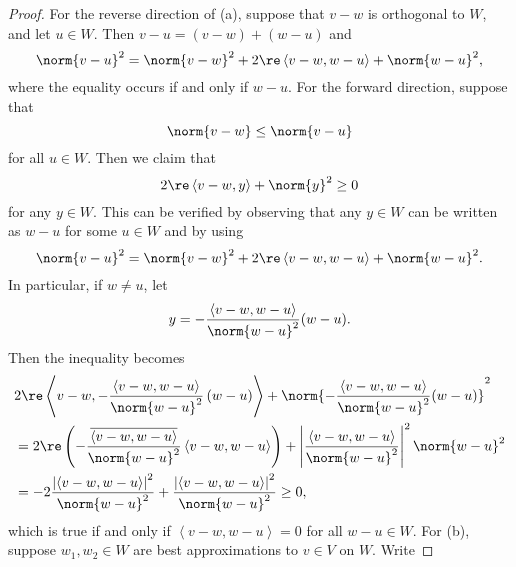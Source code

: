 \documentclass[linearalgebraII]{subfiles}
\begin{document}
    \begin{proof}
        For the reverse direction of (a), suppose that $v-w$ is orthogonal to $W$, and let $u\in W$. Then $v-u = \left( v-w \right) + \left( w-u \right)$ and
        \begin{equation*}
            \norm{v-u}^2 = \norm{v-w}^2 + 2\re\left\langle v-w, w-u\right\rangle + \norm{w-u}^2,
        \end{equation*}
        where the equality occurs if and only if $w-u$. For the forward direction, suppose that
        \begin{equation*}
            \norm{v-w}\leq \norm{v-u}
        \end{equation*}
        for all $u\in W$. Then we claim that
        \begin{equation*}
            2\re\left\langle v-w, y\right\rangle + \norm{y}^2 \geq 0
        \end{equation*}
        for any $y\in W$. This can be verified by observing that any $y\in W$ can be written as $w-u$ for some $u\in W$ and by using 
        \begin{equation*}
            \norm{v-u}^2 = \norm{v-w}^2 + 2\re\left\langle v-w, w-u\right\rangle + \norm{w-u}^2.
        \end{equation*}
        In particular, if $w\neq u$, let
        \begin{equation*}
            y = - \frac{\left\langle v-w, w-u\right\rangle }{\norm{w-u}^2} (w-u).
        \end{equation*}
        Then the inequality becomes
        \begin{align*}
            & 2\re\left\langle v-w, -\frac{\left\langle v-w, w-u\right\rangle }{\norm{w-u}^2}\left( w-u \right) \right\rangle +  \norm{-\frac{\left\langle v-w, w-u\right\rangle }{\norm{w-u}^2}(w-u)}^2 \\
            & = 2\re\left( -\frac{\overline{\left\langle v-w, w-u\right\rangle }}{\norm{w-u}^2}\left\langle v-w, w-u\right\rangle  \right) + \left| \frac{\left\langle v-w, w-u\right\rangle }{\norm{w-u}^2} \right| ^2 \norm{w-u}^2 \\
            & = -2 \frac{\left| \left\langle v-w, w-u\right\rangle  \right| ^2}{\norm{w-u}^2} + \frac{\left| \left\langle v-w, w-u\right\rangle  \right| ^2}{\norm{w-u}^2} \geq 0,
        \end{align*} 
        which is true if and only if $\left\langle v-w,w-u \right\rangle = 0$ for all $w-u\in W$. For (b), suppose $w_1,w_2\in W$ are best approximations to $v\in V$ on $W$. Write

\end{proof}
\end{document}
